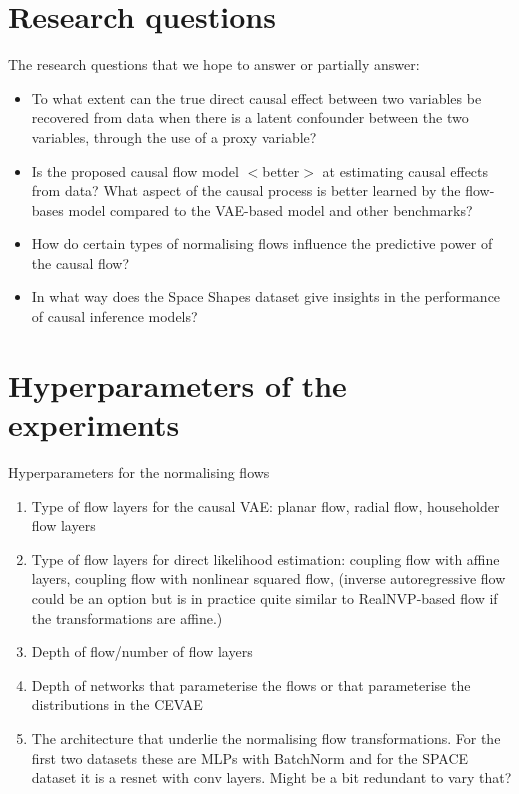 \documentclass{article}
\begin{document}
\section*{Research questions}
The research questions that we hope to answer or partially answer:
\begin{itemize}
    \item To what extent can the true direct causal effect between two variables be recovered from data when there is a latent confounder between the two variables, through the use of a proxy variable?
    \item Is the proposed causal flow model $<$better$>$ at estimating causal effects from data? What aspect of the causal process is better learned by the flow-bases model compared to the VAE-based model and other benchmarks?
    \item How do certain types of normalising flows influence the predictive power of the causal flow?
    \item In what way does the Space Shapes dataset give insights in the performance of causal inference models?
\end{itemize}

\section*{Hyperparameters of the experiments}

Hyperparameters for the normalising flows
\begin{enumerate}
    \item Type of flow layers for the causal VAE: planar flow, radial flow, householder flow layers
    \item Type of flow layers for direct likelihood estimation: coupling flow with affine layers, coupling flow with nonlinear squared flow, (inverse autoregressive flow could be an option but is in practice quite similar to RealNVP-based flow if the transformations are affine.)
    \item Depth of flow/number of flow layers
    \item Depth of networks that parameterise the flows or that parameterise the distributions in the CEVAE
    \item The architecture that underlie the normalising flow transformations. For the first two datasets these are MLPs with BatchNorm and for the SPACE dataset it is a resnet with conv layers. Might be a bit redundant to vary that?
\end{enumerate}
\end{document}
